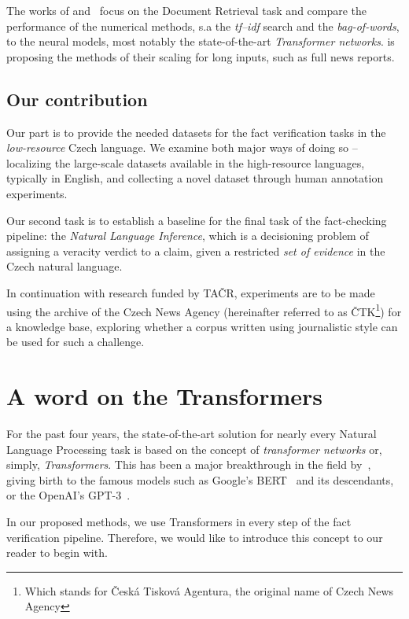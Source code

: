 The works of \cite{rypar} and~\cite{dedkova} focus on the Document Retrieval task and compare the performance of the numerical methods, s.a the \textit{tf--idf} search and the \textit{bag-of-words}, to the neural models, most notably the state-of-the-art \textit{Transformer networks}\cite{vaswani}. \cite{gazo} is proposing the methods of their scaling for long inputs, such as full news reports.

\subsection{Our contribution}
Our part is to provide the needed datasets for the fact verification tasks in the \textit{low-resource} Czech language. We examine both major ways of doing so -- localizing the large-scale datasets available in the high-resource languages, typically in English, and collecting a novel dataset through human annotation experiments.

Our second task is to establish a baseline for the final task of the fact-checking pipeline: the \textit{Natural Language Inference}, which is a decisioning problem of assigning a veracity verdict to a claim, given a restricted \textit{set of evidence} in the Czech natural language.

In continuation with research funded by \textsf{TAČR}, experiments are to be made using the archive of the \textsf{Czech News Agency} (hereinafter referred to as \textsf{ČTK}\footnote{Which stands for \"{\textsf{Česká Tisková Agentura}}, the original name of \textsf{Czech News Agency}}) for a knowledge base, exploring whether a corpus written using journalistic style can be used for such a challenge.



\section{A word on the Transformers}
\label{sec:transformers}
For the past four years, the state-of-the-art solution for nearly every Natural Language Processing task is based on the concept of \textit{transformer networks} or, simply, \textit{Transformers}. This has been a major breakthrough in the field by~\cite{vaswani}, giving birth to the famous models such as \textsf{Google}'s \textsf{BERT}~\cite{bert} and its descendants, or the \textsf{OpenAI}'s \textsf{GPT-3}~\cite{gpt3}.

In our proposed methods, we use Transformers in every step of the fact verification pipeline. Therefore, we would like to introduce this concept to our reader to begin with. 

